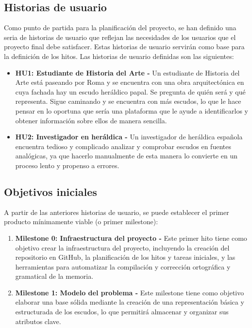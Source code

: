 \subsection{Historias de usuario} \label{sec:historias_usuario}
Como punto de partida para la planificación del proyecto, se han definido una seria de 
historias de usuario que reflejan las necesidades de los usuarios que el proyecto final
debe satisfacer. Estas historias de usuario servirán como base para la definición de los hitos.
Las historias de usuario definidas son las siguientes:
\begin{itemize}
    \item \textbf{HU1: Estudiante de Historia del Arte - }\label{sec:hu1}Un estudiante de Historia del 
    Arte está paseando por Roma y se encuentra con una obra arquitectónica en cuya fachada
    hay un escudo heráldico papal. Se pregunta de quién será y qué representa. Sigue caminando 
    y se encuentra con más escudos, lo que le hace pensar en lo oportuna que sería una 
    plataforma que le ayude a identificarlos y obtener información sobre ellos de manera 
    sencilla.
    \item \textbf{HU2: Investigador en heráldica - }\label{sec:hu2}Un investigador de heráldica española
    encuentra tedioso y complicado analizar y comprobar escudos en fuentes analógicas, ya 
    que hacerlo manualmente de esta manera lo convierte en un proceso lento y propenso a 
    errores.
\end{itemize}

\subsection{Objetivos iniciales}
A partir de las anteriores historias de usuario, se puede establecer el primer
producto mínimamente viable (o primer milestone):
\begin{enumerate}
    \item \textbf{Milestone 0: Infraestructura del proyecto - }Este primer hito tiene como 
    objetivo crear la infraestructura del proyecto, incluyendo la creación del repositorio
    en GitHub, la planificación de los hitos y tareas iniciales, y las herramientas para automatizar
    la compilación y corrección ortográfica y gramatical de la memoria.
    \item \textbf{Milestone 1: Modelo del problema - }Este milestone tiene como objetivo
    elaborar una base sólida mediante la creación de una representación básica y estructurada
    de los escudos, lo que permitirá almacenar y organizar sus atributos clave.
\end{enumerate}


